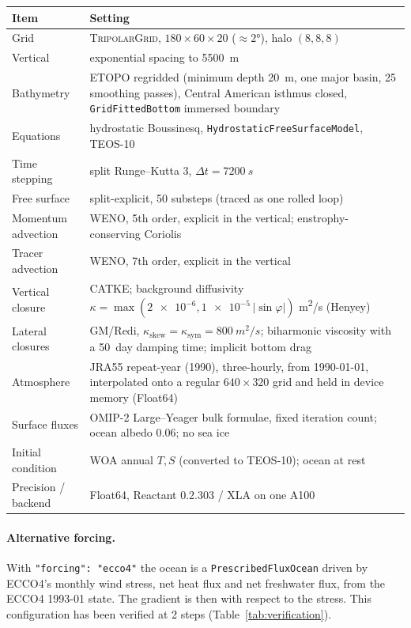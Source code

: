 \documentclass[11pt]{article}
\begin{document}
\begin{center}\small
\begin{tabular}{@{}lp{}@{}}
\toprule
Item & Setting \\
\midrule
Grid & \textsc{TripolarGrid}, $180\times60\times20$ ($\approx\ang{2}$), halo $(8,8,8)$ \\
Vertical & exponential spacing to \SI{5500}{m} \\
Bathymetry & ETOPO regridded (minimum depth \SI{20}{m}, one major basin, 25 smoothing passes),
             Central American isthmus closed, \texttt{GridFittedBottom} immersed boundary \\
Equations & hydrostatic Boussinesq, \texttt{HydrostaticFreeSurfaceModel}, TEOS-10 \\
Time stepping & split Runge--Kutta 3, $\Delta t = \SI{7200}{s}$ \\
Free surface & split-explicit, 50 substeps (traced as one rolled loop) \\
Momentum advection & WENO, 5th order, explicit in the vertical; enstrophy-conserving Coriolis \\
Tracer advection & WENO, 7th order, explicit in the vertical \\
Vertical closure & CATKE; background diffusivity $\kappa = \max(\num{2e-6}, \num{1e-5}\,|\sin\varphi|)$
                   \si{m^2/s} (Henyey) \\
Lateral closures & GM/Redi, $\kappa_{\text{skew}} = \kappa_{\text{sym}} = \SI{800}{m^2/s}$;
                   biharmonic viscosity with a \SI{50}{day} damping time; implicit bottom drag \\
Atmosphere & JRA55 repeat-year (1990), three-hourly, from 1990-01-01, interpolated onto a regular
             $640\times320$ grid and held in device memory (Float64) \\
Surface fluxes & OMIP-2 Large--Yeager bulk formulae, fixed iteration count; ocean albedo 0.06; no sea ice \\
Initial condition & WOA annual $T, S$ (converted to TEOS-10); ocean at rest \\
Precision / backend & Float64, Reactant 0.2.303 / XLA on one A100 \\
\bottomrule
\end{tabular}
\end{center}

\paragraph{Alternative forcing.} With \texttt{"forcing": "ecco4"} the ocean is a
\texttt{PrescribedFluxOcean} driven by ECCO4's monthly wind stress, net heat flux and net freshwater flux,
from the ECCO4 1993-01 state. The gradient is then with respect to the stress. This configuration has
been verified at 2 steps (Table~\ref{tab:verification}).
\end{document}
